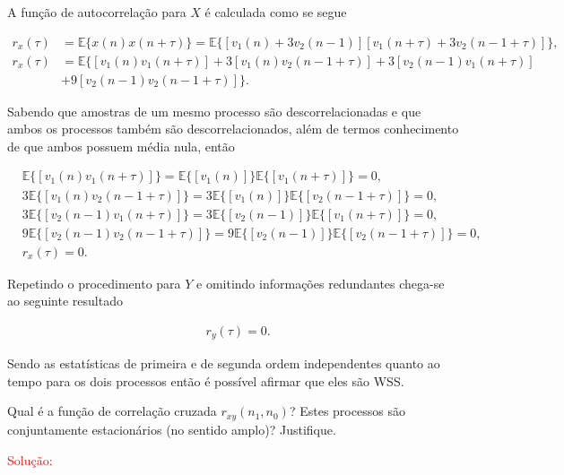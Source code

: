         A função de autocorrelação para $X$ é calculada como se segue 
        
        \begin{align}
            r_{x}(\tau) &= \mathbb{E}\{x(n)x(n + \tau)\} = \mathbb{E}\{[v_{1}(n) + 3v_{2}(n-1)][v_{1}(n + \tau) + 3v_{2}(n-1 + \tau)]\}, \\
            r_{x}(\tau) &= \mathbb{E}\{[v_{1}(n)v_{1}(n + \tau)] + 3[v_{1}(n)v_{2}(n-1 + \tau)] + 3[v_{2}(n-1)v_{1}(n + \tau)] \\ 
            &+ 9[v_{2}(n-1)v_{2}(n-1 + \tau)] \}.    
        \end{align}
        
        Sabendo que amostras de um mesmo processo são descorrelacionadas e que ambos os processos também são descorrelacionados, além de termos conhecimento 
        de que ambos possuem média nula, então 
        
        \begin{align}
            &\mathbb{E}\{[v_{1}(n)v_{1}(n + \tau)]\} = \mathbb{E}\{[v_{1}(n)]\} \mathbb{E}\{[v_{1}(n + \tau)]\} = 0, \\ 
            &3\mathbb{E}\{[v_{1}(n)v_{2}(n-1 + \tau)]\} = 3\mathbb{E}\{[v_{1}(n)]\} \mathbb{E}\{[v_{2}(n-1 + \tau)]\} = 0, \\
            &3\mathbb{E}\{[v_{2}(n-1)v_{1}(n + \tau)]\} = 3\mathbb{E}\{[v_{2}(n-1)]\} \mathbb{E}\{[v_{1}(n + \tau)]\} = 0, \\
            &9\mathbb{E}\{[v_{2}(n-1)v_{2}(n-1 + \tau)]\} = 9\mathbb{E}\{[v_{2}(n-1)]\} \mathbb{E}\{[v_{2}(n-1 + \tau)]\} = 0, \\ 
            &r_{x}(\tau) = 0.
        \end{align}
        
        Repetindo o procedimento para $Y$ e omitindo informações redundantes chega-se ao seguinte resultado
        
        \begin{align}
            &r_{y}(\tau) = 0.
        \end{align}
        
        Sendo as estatísticas de primeira e de segunda ordem independentes quanto ao tempo para os dois processos então é possível afirmar que eles são WSS.
    
     Qual é a função de correlação cruzada $r_{xy}(n_1,n_0)$? Estes processos são conjuntamente estacionários (no sentido amplo)? Justifique.
    
        \textcolor{red}{Solução:}
        
